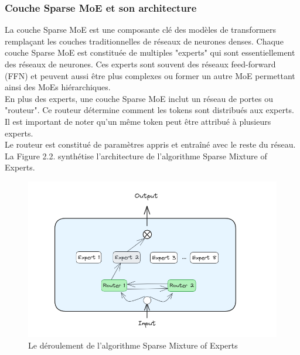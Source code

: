 \subsubsection{Couche Sparse MoE et son architecture}
\justifying
La couche Sparse MoE est une composante clé des modèles de transformers remplaçant les couches traditionnelles de réseaux de neurones denses. Chaque couche Sparse MoE est constituée de multiples "experts" qui sont essentiellement des réseaux de neurones. Ces experts sont souvent des réseaux feed-forward (FFN) et peuvent aussi être plus complexes ou former un autre MoE permettant ainsi des MoEs hiérarchiques.\\
En plus des experts, une couche Sparse MoE inclut un réseau de portes ou "routeur". Ce routeur détermine comment les tokens sont distribués aux experts. Il est important de noter qu'un même token peut être attribué à plusieurs experts.\\
Le routeur est constitué de paramètres appris et entraîné avec le reste du réseau.\\
La Figure 2.2. synthétise l’architecture de l’algorithme Sparse Mixture of Experts.

\begin{figure}[H]
    \centering
    \includegraphics[width=\textwidth]{images/chp2/fig2.png}
    \caption{Le déroulement de l’algorithme Sparse Mixture of Experts}
    \label{fig:architecture sparse moe}    
\end{figure}

